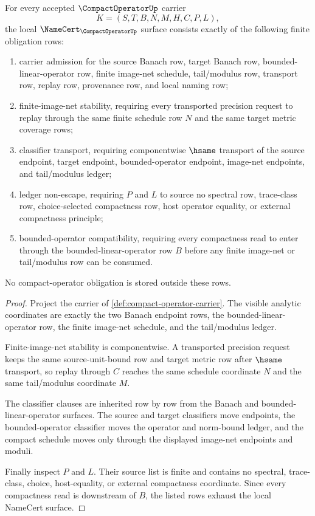 \begin{theorem}
\label{thm:compact-operator-namecert-obligations}
For every accepted $\CompactOperatorUp$ carrier
$$
K=(S,T,B,N,M,H,C,P,L),
$$
the local $\NameCert_{\CompactOperatorUp}$ surface consists exactly of the following finite obligation rows:
\begin{enumerate}
\item carrier admission for the source Banach row, target Banach row, bounded-linear-operator row, finite image-net schedule, tail/modulus row, transport row, replay row, provenance row, and local naming row;
\item finite-image-net stability, requiring every transported precision request to replay through the same finite schedule row $N$ and the same target metric coverage rows;
\item classifier transport, requiring componentwise $\hsame$ transport of the source endpoint, target endpoint, bounded-operator endpoint, image-net endpoints, and tail/modulus ledger;
\item ledger non-escape, requiring $P$ and $L$ to source no spectral row, trace-class row, choice-selected compactness row, host operator equality, or external compactness principle;
\item bounded-operator compatibility, requiring every compactness read to enter through the bounded-linear-operator row $B$ before any finite image-net or tail/modulus row can be consumed.
\end{enumerate}
No compact-operator obligation is stored outside these rows.
\end{theorem}
\begin{proof}
Project the carrier of \autoref{def:compact-operator-carrier}. The visible analytic coordinates are exactly the two Banach endpoint rows, the bounded-linear-operator row, the finite image-net schedule, and the tail/modulus ledger.

Finite-image-net stability is componentwise. A transported precision request keeps the same source-unit-bound row and target metric row after $\hsame$ transport, so replay through $C$ reaches the same schedule coordinate $N$ and the same tail/modulus coordinate $M$.

The classifier clauses are inherited row by row from the Banach and bounded-linear-operator surfaces. The source and target classifiers move endpoints, the bounded-operator classifier moves the operator and norm-bound ledger, and the compact schedule moves only through the displayed image-net endpoints and moduli.

Finally inspect $P$ and $L$. Their source list is finite and contains no spectral, trace-class, choice, host-equality, or external compactness coordinate. Since every compactness read is downstream of $B$, the listed rows exhaust the local NameCert surface.
\end{proof}

